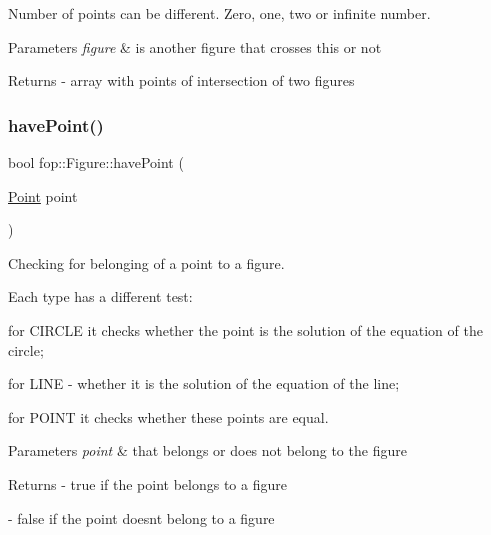 Number of points can be different. Zero, one, two or infinite number. 
\begin{DoxyParams}{Parameters}
{\em figure} & is another figure that crosses \textquotesingle{}this\textquotesingle{} or not \\
\hline
\end{DoxyParams}
\begin{DoxyReturn}{Returns}
-\/ array with points of intersection of two figures 
\end{DoxyReturn}
\mbox{\label{classfop_1_1_figure_adaa195836173f677f9207c0b5f9c84fe}} 
\subsubsection{\texorpdfstring{have\+Point()}{havePoint()}}
{\footnotesize\ttfamily bool fop\+::\+Figure\+::have\+Point (\begin{DoxyParamCaption}\item[{\mbox{\hyperlink{structtdp_1_1_point}{Point}}}]{point }\end{DoxyParamCaption})}



Checking for belonging of a point to a figure. 

Each type has a different test\+:


\begin{DoxyItemize}
\item for C\+I\+R\+C\+LE it checks whether the \textquotesingle{}point\textquotesingle{} is the solution of the equation of the circle;
\item for L\+I\+NE -\/ whether it is the solution of the equation of the line;
\item for P\+O\+I\+NT it checks whether these points are equal. 
\begin{DoxyParams}{Parameters}
{\em point} & that belongs or does not belong to the figure \\
\hline
\end{DoxyParams}
\begin{DoxyReturn}{Returns}
-\/ true if the point belongs to a figure 

-\/ false if the point doesn\textquotesingle{}t belong to a figure 
\end{DoxyReturn}

\end{DoxyItemize}\mbox{\label{classfop_1_1_figure_aae228e84324267f99ea7ece5067c94d9}} 
